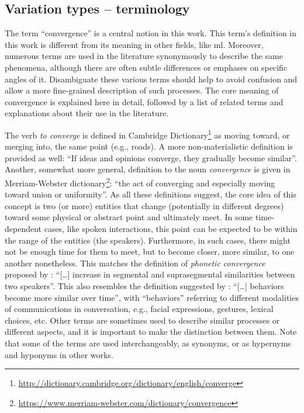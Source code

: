 \subsection{Variation types -- terminology}
\label{subsec:variation_types}

The term \enquote{convergence} is a central notion in this work.
This term's definition in this work is different from its meaning in other fields, like \ac{ml}.
Moreover, numerous terms are used in the literature synonymously to describe the same phenomena, although there are often subtle differences or emphases on specific angles of it.
Disambiguate these various terms should help to avoid confusion and allow a more fine-grained description of such processes.
The core meaning of convergence is explained here in detail, followed by a list of related terms and explanations about their use in the literature.

The verb \textit{to converge} is defined in Cambridge Dictionary\footnote{\url{http://dictionary.cambridge.org/dictionary/english/converge}} as moving toward, or merging into, the same point (e.g., roads).
A more non-materialistic definition is provided as well: \enquote{If ideas and opinions converge, they gradually become similar}.
Another, somewhat more general, definition to the noun \textit{convergence} is given in Merriam-Webster dictionary\footnote{\url{https://www.merriam-webster.com/dictionary/convergence}}: \enquote{the act of converging and especially moving toward union or uniformity}.
As all these definitions suggest, the core idea of this concept is two (or more) entities that change (potentially in different degrees) toward some physical or abstract point and ultimately meet.
In some time-dependent cases, like spoken interactions, this point can be expected to be within the range of the entities (the speakers).
Furthermore, in such cases, there might not be enough time for them to meet, but to become closer, more similar, to one another nonetheless.
This matches the definition of \emph{phonetic convergence} proposed by \citet{Pardo2006phonetic}: \enquote{[\ldots] increase in segmental and suprasegmental similarities between two speakers}.
This also resembles the definition suggested by \citet{Xia2014prosodic}: \enquote{[\ldots] behaviors become more similar over time}, with \enquote{behaviors} referring to different modalities of communications in conversation, e.g., facial expressions, gestures, lexical choices, etc.
Other terms are sometimes used to describe similar processes or different aspects, and it is important to make the distinction between them.
Note that some of the terms are used interchangeably, as synonyms, or as hypernyms and hyponyms in other works.

